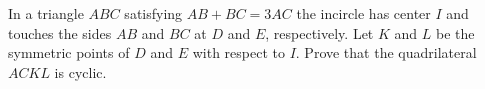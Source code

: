 In a triangle $ABC$ satisfying $AB + BC = 3AC$ the incircle has center $I$ and touches the sides $AB$ and $BC$ at $D$ and $E$, respectively. Let $K$ and $L$ be the symmetric points of $D$ and $E$ with respect to $I$. Prove that the quadrilateral $ACKL$ is cyclic.

